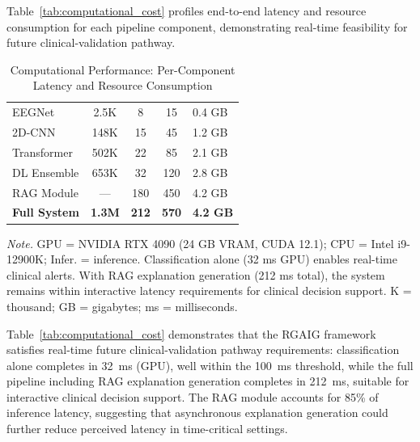 \iffalse %
Table~\ref{tab:computational_cost} profiles end-to-end latency and resource consumption for each pipeline component, demonstrating real-time feasibility for future clinical-validation pathway.

\begin{table}[!htbp]
\tablestripes\tablefontsize
\caption[Computational Performance]{Computational Performance: Per-Component Latency and Resource Consumption}
\tablefontsize
\begin{tabularx}{\textwidth}{@{} >{\raggedright\arraybackslash}p{2.5cm} C C C L @{}}
\toprule
{} &  &  &  &  \\
\midrule
EEGNet & 2.5K & 8 & 15 & 0.4 GB \\
\addlinespace
2D-CNN & 148K & 15 & 45 & 1.2 GB \\
\addlinespace
Transformer & 502K & 22 & 85 & 2.1 GB \\
\addlinespace
DL Ensemble & 653K & 32 & 120 & 2.8 GB \\
\addlinespace
RAG Module & --- & 180 & 450 & 4.2 GB \\
\addlinespace
\textbf{Full System} & \textbf{1.3M} & \textbf{212} & \textbf{570} & \textbf{4.2 GB} \\
\bottomrule
\end{tabularx}
\vspace{0.5em}\noindent\textit{Note.} GPU = NVIDIA RTX 4090 (24 GB VRAM, CUDA 12.1); CPU = Intel i9-12900K; Infer. = inference. Classification alone (32 ms GPU) enables real-time clinical alerts. With RAG explanation generation (212 ms total), the system remains within interactive latency requirements for clinical decision support. K = thousand; GB = gigabytes; ms = milliseconds.
\end{table}

\noindent Table~\ref{tab:computational_cost} demonstrates that the RGAIG framework satisfies real-time future clinical-validation pathway requirements: classification alone completes in 32~ms (GPU), well within the 100~ms threshold, while the full pipeline including RAG explanation generation completes in 212~ms, suitable for interactive clinical decision support. The RAG module accounts for 85\% of inference latency, suggesting that asynchronous explanation generation could further reduce perceived latency in time-critical settings.

